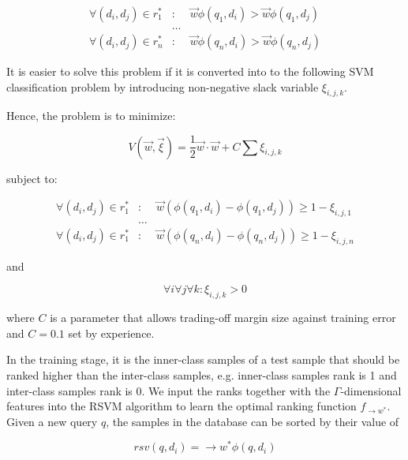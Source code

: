 \begin{eqnarray}
\forall (d_i,d_j) \in r_1^* &:& \overrightarrow{w}\phi(q_1,d_i)> \overrightarrow{w}\phi(q_1,d_j)\\
&\dots&\\
\forall (d_i,d_j) \in r_n^* &:& \overrightarrow{w}\phi(q_n,d_i)> \overrightarrow{w}\phi(q_n,d_j)
\end{eqnarray}

It is easier to solve this problem if it is converted into to the following SVM classification problem by introducing non-negative slack variable $\xi_{i,j,k}$.

Hence, the problem is to minimize:

\begin{equation}
V(\overrightarrow{w},\overrightarrow{\xi})=\frac{1}{2}\overrightarrow{w}\cdot\overrightarrow{w}+C\sum \xi_{i,j,k}
\end{equation}

subject to:

\begin{eqnarray}
\forall (d_i,d_j) \in r_1^* &:& \overrightarrow{w} \left(\phi(q_1,d_i)-\phi(q_1,d_j)\right)\geq 1- \xi_{i,j,1}\\
&\dots&\\
\forall (d_i,d_j) \in r_1^* &:& \overrightarrow{w} \left(\phi(q_n,d_i)-\phi(q_n,d_j)\right)\geq 1- \xi_{i,j,n}
\end{eqnarray}

and

\begin{equation}
\forall i \forall j \forall k : \xi_{i,j,k}>0
\end{equation}

where $C$ is a parameter that allows trading-off margin size against training error and $C=0.1$ set by experience.

In the training stage, it is the inner-class samples of a test sample that should be ranked higher than the inter-class samples, e.g. inner-class samples rank is 1 and inter-class samples rank is 0. We input the ranks together with the $\Gamma$-dimensional features into the RSVM algorithm to learn the optimal ranking function $f_{\rightarrow{w}^*}$. Given a new query $q$, the samples in the database can be sorted by their value of

\begin{equation}
rsv(q,d_i)=\rightarrow{w}^*\phi(q,d_i)
\end{equation}